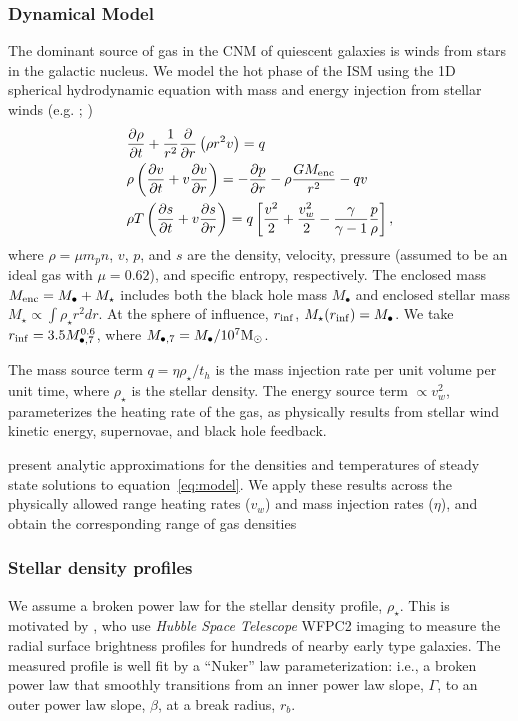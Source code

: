 \documentclass[usenatbib,fleqn]{mnras}
\newcommand{\Mbh}[1][]{M_{\bullet#1}}
\newcommand{\Menc}{M_{\rm enc}}
\renewcommand{\th}{t_h}
\newcommand{\Msun}{{\rm M_\odot}}
\begin{document}
\subsubsection{Dynamical Model}
\label{sec:model}

The dominant source of gas in the CNM of quiescent galaxies is winds
from stars in the galactic nucleus. We model the hot phase of the ISM
using the 1D spherical hydrodynamic equation with mass and energy
injection from stellar winds (e.g. \citealt{Holzer+1970};
\citealt{Quataert2004})
\begin{align}
  &\frac{\partial \rho}{\partial t}+\frac{1}{r^2}\frac{\partial}{\partial r}\left(\rho r^2 v\right)=q \label{eq:drhodt}\\
  &\rho \left(\frac{\partial v}{\partial t} + v\frac{\partial
      v}{\partial r}\right) =-\frac{\partial p}{\partial r}- \rho\frac{GM_{\rm enc}}{r^{2}} -q v \label{eq:dvdt}\\
  &\rho T\left(\frac{\partial s}{\partial t} + v\frac{\partial
      s}{\partial
      r}\right)=q\left[\frac{v^2}{2}+\frac{v_w^2}{2}-\frac{\gamma}{\gamma-1}
    \frac{p}{\rho} \right] ,
\label{eq:model}
\end{align}
where $\rho = \mu m_p n$, $v$, $p$, and $s$ are the density, velocity,
pressure (assumed to be an ideal gas with $\mu = 0.62$), and specific
entropy, respectively.  The enclosed mass $\Menc = M_{\bullet} +
M_{\star}$ includes both the black hole mass $M_{\bullet}$ and
enclosed stellar mass $M_{\star} \propto \int \rho_{\star}r^{2}dr$. At
the sphere of influence, $r_{\rm inf}$, $M_{\star}(r_{\rm inf})=\Mbh$.
We take $r_{\rm inf}=3.5 \Mbh[,7]^{0.6}$, where $\Mbh[,7]=\Mbh/10^7
\Msun$.

The mass source term $q =\eta \rho_\star/\th$ is the mass injection
rate per unit volume per unit time, where $\rho_\star$ is the stellar
density. The energy source term $\propto v_w^{2}$, parameterizes the
heating rate of the gas, as physically results from stellar wind
kinetic energy, supernovae, and black hole feedback.

\citet{Generozov+2015} present analytic approximations for the
densities and temperatures of steady state solutions to
equation~\eqref{eq:model}. We apply these results across the
physically allowed range heating rates ($v_w$) and mass injection
rates ($\eta$), and obtain the corresponding range of gas densities

\subsubsection{Stellar density profiles}
We assume a broken power law for the stellar density profile, $\rho_{\star}$.
This is motivated by \citet{Lauer+2007}, who use {\it
  Hubble Space Telescope} WFPC2 imaging to measure the radial surface
brightness profiles for hundreds of nearby early type galaxies. The
measured profile is well fit by a ``Nuker'' law parameterization:
i.e., a broken power law that smoothly transitions from an inner power law
slope, $\Gamma$, to an outer power law slope, $\beta$, at a break
radius, $r_b$.
\end{document}
